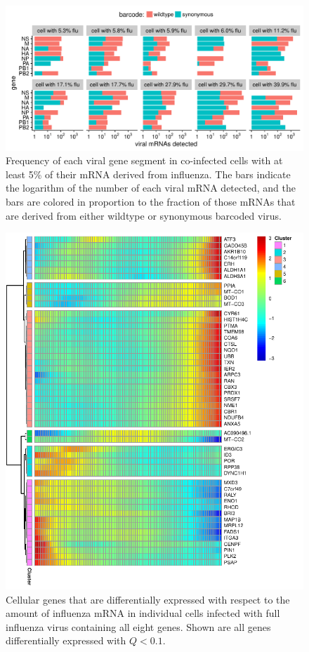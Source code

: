 \documentclass[9pt,lineno]{elife}
\begin{document}
\begin{figure}
\includegraphics[width=\linewidth]{figures/p_coinfection.pdf}
\caption{
Frequency of each viral gene segment in co-infected cells with at least 5\% of their mRNA derived from influenza.
The bars indicate the logarithm of the number of each viral mRNA detected, and the bars are colored in proportion to the fraction of those mRNAs that are derived from either wildtype or synonymous barcoded virus.
}
\label{fig:coexpression}
\end{figure}

\begin{figure}
\includegraphics[width=0.8\linewidth]{figures/p_cellular_heatmap.pdf}
\caption{
Cellular genes that are differentially expressed with respect to the amount of influenza mRNA in individual cells infected with full influenza virus containing all eight genes.
Shown are all genes differentially expressed with $Q < 0.1$.}
\label{fig:cellulargenes}
\end{figure}
\end{document}
